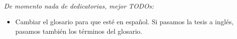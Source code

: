 \cleardoublepage
~\vfill
\thispagestyle{empty}
\begin{doublespace}
	\noindent\fontsize{16}{20}\selectfont\itshape
	\nohyphenation De momento nada de dedicatorias, mejor TODOs:
	\begin{itemize}
		\item Cambiar el glosario para que esté en español. Si pasamos la tesis a inglés, pasamos también los términos del glosario.
	\end{itemize}
\end{doublespace}
\vfill
\vfill

